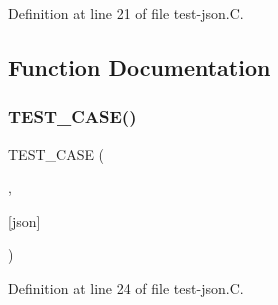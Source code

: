 Definition at line 21 of file test-\/json.\+C.



\subsection{Function Documentation}
\mbox{\label{test-json_8C_ab2f8fb9c959d00269e29b0408d792fc0}} 
\subsubsection{\texorpdfstring{T\+E\+S\+T\+\_\+\+C\+A\+S\+E()}{TEST\_CASE()}}
{\footnotesize\ttfamily T\+E\+S\+T\+\_\+\+C\+A\+SE (\begin{DoxyParamCaption}\item[{\char`\"{}test \hyperlink{dictModifier_8C_ab701e3ac61a85b337ec5c1abaad6742d}{json}\char`\"{}}]{,  }\item[{\char`\"{}\char`\"{}}]{\mbox{[}json\mbox{]} }\end{DoxyParamCaption})}



Definition at line 24 of file test-\/json.\+C.

